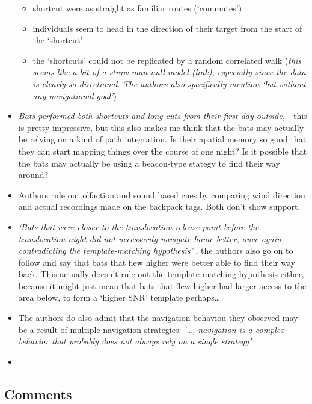 \documentclass[
]{book}
\providecommand{\tightlist}{%
  \setlength{\itemsep}{0pt}\setlength{\parskip}{0pt}}
\begin{document}
\begin{itemize}
  \begin{itemize}
  \tightlist
  \item
    shortcut were as straight as familiar routes (`commutes')
  \item
    individuals seem to head in the direction of their target from the start of the `shortcut'
  \item
    the `shortcuts' could not be replicated by a random correlated walk (\emph{this seems like a bit of a straw man null model (\href{https://www.fharrell.com/post/nhst-never/}{link}), especially since the data is clearly so directional. The authors also specifically mention `but without any navigational goal'})
  \end{itemize}
\item
  \emph{Bats performed both shortcuts and long-cuts from their first day outside,} - this is pretty impressive, but this also makes me think that the bats may actually be relying on a kind of path integration. Is their apatial memory so good that they can start mapping things over the course of one night? Is it possible that the bats may actually be using a beacon-type stategy to find their way around?
\item
  Authors rule out olfaction and sound based cues by comparing wind direction and actual recordings made on the backpack tags. Both don't show support.
\item
  \emph{`Bats that were closer to the translocation release point before the translocation night did not necessarily navigate home better, once again contradicting the template-matching hypothesis'} , the authors also go on to follow and say that bats that flew higher were better able to find their way back. This actually doesn't rule out the template matching hypothesis either, because it might just mean that bats that flew higher had larger access to the area below, to form a `higher SNR' template perhaps\ldots{}
\item
  The authors do also admit that the navigation behaviou they observed may be a result of multiple navigation strategies: \emph{`\ldots, navigation is a complex behavior that probably does not always rely on a single strategy'}
\item
\end{itemize}

\hypertarget{comments-1}{%
\subsection{Comments}\label{comments-1}}
\end{document}
